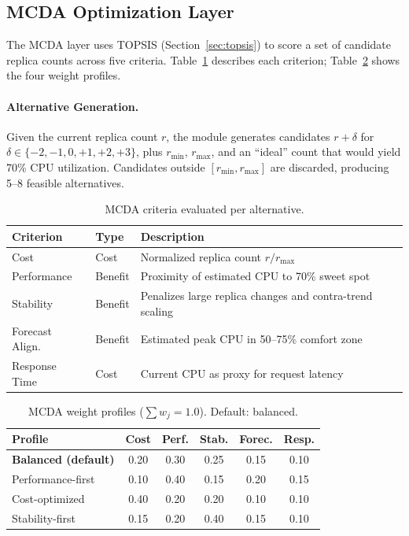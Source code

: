 \subsection{MCDA Optimization Layer}
\label{sec:mcda-layer}

The MCDA layer uses TOPSIS (Section~\ref{sec:topsis}) to score a set of candidate
replica counts across five criteria. Table~\ref{tab:mcda-criteria} describes each
criterion; Table~\ref{tab:mcda-weights} shows the four weight profiles.

\paragraph{Alternative Generation.}
Given the current replica count $r$, the module generates candidates
$r + \delta$ for $\delta \in \{-2,-1,0,+1,+2,+3\}$, plus
$r_{\min}$, $r_{\max}$, and an ``ideal'' count that would yield
70\% CPU utilization. Candidates outside $[r_{\min}, r_{\max}]$ are discarded,
producing 5--8 feasible alternatives.

\begin{table}[h]
  \centering
  \caption{MCDA criteria evaluated per alternative.}
  \label{tab:mcda-criteria}
  \small
  \begin{tabular}{llp{5.5cm}}
    \toprule
    Criterion & Type & Description \\
    \midrule
    Cost             & Cost    & Normalized replica count $r / r_{\max}$ \\
    Performance      & Benefit & Proximity of estimated CPU to 70\% sweet spot \\
    Stability        & Benefit & Penalizes large replica changes and contra-trend scaling \\
    Forecast Align.  & Benefit & Estimated peak CPU in 50--75\% comfort zone \\
    Response Time    & Cost    & Current CPU as proxy for request latency \\
    \bottomrule
  \end{tabular}
\end{table}

\begin{table}[h]
  \centering
  \caption{MCDA weight profiles ($\sum w_j = 1.0$). Default: balanced.}
  \label{tab:mcda-weights}
  \small
  \begin{tabular}{lccccc}
    \toprule
    Profile & Cost & Perf. & Stab. & Forec. & Resp. \\
    \midrule
    \textbf{Balanced (default)} & 0.20 & 0.30 & 0.25 & 0.15 & 0.10 \\
    Performance-first           & 0.10 & 0.40 & 0.15 & 0.20 & 0.15 \\
    Cost-optimized              & 0.40 & 0.20 & 0.20 & 0.10 & 0.10 \\
    Stability-first             & 0.15 & 0.20 & 0.40 & 0.15 & 0.10 \\
    \bottomrule
  \end{tabular}
\end{table}

